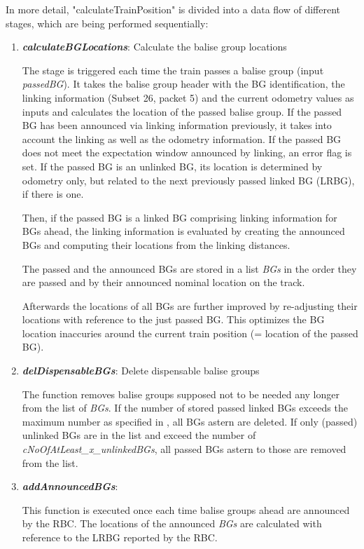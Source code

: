 In more detail, "calculateTrainPosition" is divided into a data flow of different stages, which are being performed sequentially: 
\begin{enumerate}
\item \textbf{\textit{calculateBGLocations}}: Calculate the balise group locations

The  stage is triggered each time the train passes a balise group (input \textit{passedBG}). It takes the balise group header with the BG identification, the linking information (Subset 26, packet 5) and the current odometry values as inputs and calculates the location of the passed balise group. If the passed BG has been announced via linking information previously, it takes into account the linking as well as the odometry information. If the passed BG does not meet the expectation window announced by linking, an error flag is set. If the passed BG is an unlinked BG, its location is determined by odometry only, but related to the next previously passed linked BG (LRBG), if there is one.

Then, if the passed BG is a linked BG comprising linking information for BGs ahead, the linking information is evaluated by creating the announced BGs and computing their locations from the linking distances.

The passed and the announced BGs are stored in a list \textit{BGs} in the order they are passed and by their announced nominal location on the track.

Afterwards the locations of all BGs are further improved by re-adjusting their locations with reference to the just passed BG. This optimizes the BG location inaccuries around the current train position (= location of the passed BG). 

\item \textbf{\textit{delDispensableBGs}}: Delete dispensable balise groups

The function removes balise groups supposed not to be needed any longer from the list of \textit{BGs}.
If the number of stored passed linked BGs exceeds the maximum number as specified in \cite[Chapter~3.6.2.2.2 c]{subset-026}, all BGs astern are deleted.
If only (passed) unlinked BGs are in the list and exceed the number of \textit{cNoOfAtLeast\_x\_unlinkedBGs}, all passed BGs astern to those are removed from the list. 

\item \textbf{\textit{addAnnouncedBGs}}: 

This function is executed once each time balise groups ahead are announced by the RBC. The locations of the announced \textit{BGs} are calculated with reference to the LRBG reported by the RBC. 


\end{enumerate}
